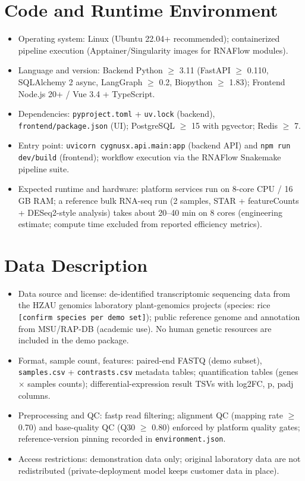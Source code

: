 \documentclass[11pt,a4paper]{article}
\begin{document}
\section{Code and Runtime Environment}
\begin{itemize}
  \item Operating system: Linux (Ubuntu 22.04+ recommended); containerized pipeline execution (Apptainer/Singularity images for RNAFlow modules).
  \item Language and version: Backend Python $\geq$ 3.11 (FastAPI $\geq$ 0.110, SQLAlchemy 2 async, LangGraph $\geq$ 0.2, Biopython $\geq$ 1.83); Frontend Node.js 20+ / Vue 3.4 + TypeScript.
  \item Dependencies: \texttt{pyproject.toml} + \texttt{uv.lock} (backend), \texttt{frontend/package.json} (UI); PostgreSQL $\geq$ 15 with pgvector; Redis $\geq$ 7.
  \item Entry point: \texttt{uvicorn cygnusx.api.main:app} (backend API) and \texttt{npm run dev/build} (frontend); workflow execution via the RNAFlow Snakemake pipeline suite.
  \item Expected runtime and hardware: platform services run on 8-core CPU / 16 GB RAM; a reference bulk RNA-seq run (2 samples, STAR + featureCounts + DESeq2-style analysis) takes about 20--40 min on 8 cores (engineering estimate; compute time excluded from reported efficiency metrics).
\end{itemize}

\section{Data Description}
\begin{itemize}
  \item Data source and license: de-identified transcriptomic sequencing data from the HZAU genomics laboratory plant-genomics projects (species: rice \texttt{[confirm species per demo set]}); public reference genome and annotation from MSU/RAP-DB (academic use). No human genetic resources are included in the demo package.
  \item Format, sample count, features: paired-end FASTQ (demo subset), \texttt{samples.csv} + \texttt{contrasts.csv} metadata tables; quantification tables (genes $\times$ samples counts); differential-expression result TSVs with log2FC, p, padj columns.
  \item Preprocessing and QC: fastp read filtering; alignment QC (mapping rate $\geq$ 0.70) and base-quality QC (Q30 $\geq$ 0.80) enforced by platform quality gates; reference-version pinning recorded in \texttt{environment.json}.
  \item Access restrictions: demonstration data only; original laboratory data are not redistributed (private-deployment model keeps customer data in place).
\end{itemize}
\end{document}

